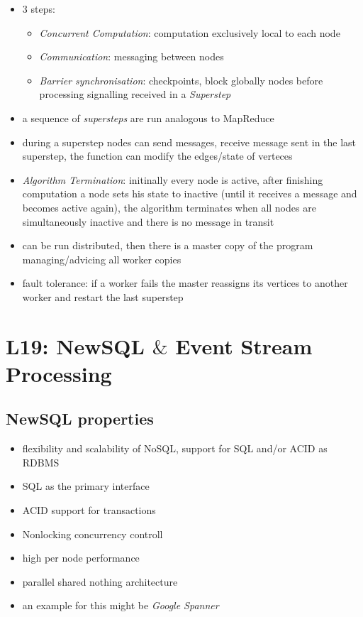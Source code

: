 \documentclass[a4paper]{article}
\begin{document}
\begin{multicols}{3}
\begin{itemize}
    \item 3 steps:
        \begin{itemize}
            \item \textit{Concurrent Computation}: computation exclusively local to each node
            \item \textit{Communication}: messaging between nodes
            \item \textit{Barrier synchronisation}: checkpoints, block globally nodes before processing signalling received in a \textit{Superstep}
        \end{itemize}
    \item a sequence of \textit{supersteps} are run analogous to MapReduce
    \item during a superstep nodes can send messages, receive message sent in the last superstep, the function can modify the edges/state of verteces
    \item \textit{Algorithm Termination}: initinally every node is active, after finishing computation a node sets his state to inactive (until it receives a message and
    becomes active again), the algorithm terminates when all nodes are simultaneously inactive and there is no message in transit
    \item can be run distributed, then there is a master copy of the program managing/advicing all worker copies 
    \item fault tolerance: if a worker fails the master reassigns its vertices to another worker and restart the last superstep 
\end{itemize}

\section{L19: NewSQL $\&$ Event Stream Processing}

\subsection{NewSQL properties}
\begin{itemize}
    \item flexibility and scalability of NoSQL, support for SQL and/or ACID as RDBMS
    \item SQL as the primary interface
    \item ACID support for transactions
    \item Nonlocking concurrency controll
    \item high per node performance 
    \item parallel shared nothing architecture
    \item an example for this might be \textit{Google Spanner}
\end{itemize}


\end{multicols}
\end{document}
